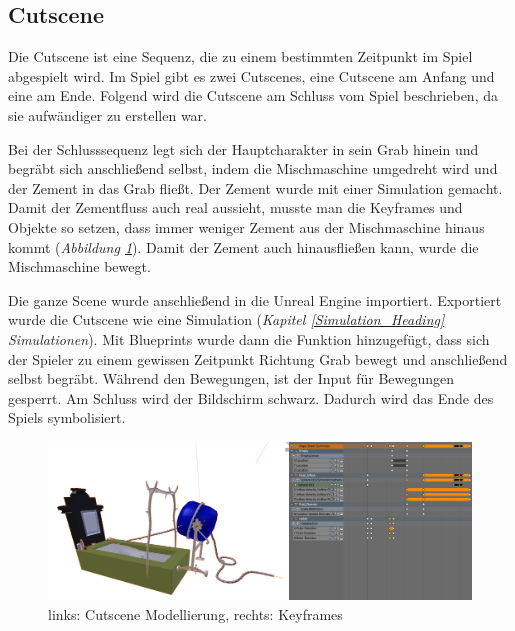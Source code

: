 \subsection{Cutscene}

Die Cutscene ist eine Sequenz, die zu einem bestimmten Zeitpunkt im Spiel abgespielt wird.
Im Spiel gibt es zwei Cutscenes, eine Cutscene am Anfang und eine am Ende. Folgend wird die Cutscene
am Schluss vom Spiel beschrieben, da sie aufwändiger zu erstellen war.

Bei der Schlusssequenz legt sich der Hauptcharakter in sein Grab hinein und begräbt sich anschließend selbst, indem
die Mischmaschine umgedreht wird und der Zement in das Grab fließt. Der Zement wurde mit einer Simulation gemacht.
Damit der Zementfluss auch real aussieht, musste man die Keyframes und Objekte so setzen, dass immer weniger Zement aus
der Mischmaschine hinaus kommt (\textit{Abbildung \ref{cutscene:image_modellierung}}). Damit der Zement auch hinausfließen kann, wurde die Mischmaschine bewegt.

Die ganze Scene wurde anschließend in die Unreal Engine importiert. Exportiert wurde die Cutscene wie eine Simulation (\textit{Kapitel \ref{Simulation_Heading} \dq Simulationen\dq}).
Mit Blueprints wurde dann die Funktion hinzugefügt, dass sich der
Spieler zu einem gewissen Zeitpunkt Richtung Grab bewegt und anschließend selbst begräbt. Während den Bewegungen, ist der Input für Bewegungen gesperrt.
Am Schluss wird der Bildschirm schwarz. Dadurch wird das Ende des Spiels symbolisiert.

\begin{figure}[h]
    \centering
    \includegraphics[width=.8\textwidth]{images/Cutscene_Modellierung.png}
    \caption{links: Cutscene Modellierung, rechts: Keyframes}
    \label{cutscene:image_modellierung}
\end{figure}